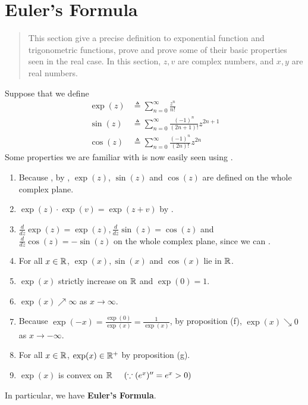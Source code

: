 \documentclass{report}
\begin{document}
\section{Euler's Formula}
\begin{abstract}
This section give a precise definition to exponential function and trigonometric functions, prove  and prove some of their basic properties seen in the real case. In this section, $z,v$ are complex numbers, and $x,y$ are real numbers.   
\end{abstract}
\begin{mdframed}
Suppose that we define 
\begin{align*}
\exp(z)&\triangleq \sum_{n=0}^\infty \frac{z^n}{n!}\\
\sin (z)&\triangleq \sum_{n=0}^\infty \frac{(-1)^n}{(2n+1)!}z^{2n+1}\\
\cos (z)&\triangleq \sum_{n=0}^\infty \frac{(-1)^n}{(2n)!}z^{2n}
\end{align*}
Some properties we are familiar with is now easily seen using . 
\begin{enumerate}[label=(\alph*)]
  \item Because , by , $\exp(z)$, $\sin(z)$ and $\cos(z)$ are defined on the whole complex plane.  
  \item $\exp(z)\cdot \exp(v)=\exp(z+v)$ by . 
  \item $\frac{d}{dz}\exp (z)=\exp (z), \frac{d}{dz}\sin (z)=\cos (z)$ and $\frac{d}{dz}\cos (z)=-\sin (z)$ on the whole complex plane, since we can  . 
  \item For all $x\in\mathbb{R}$, $\exp (x),\sin (x)$ and $\cos (x)$ lie in $\mathbb{R}$.   
  \item $\exp(x)$  strictly increase on $\mathbb{R}$ and $\exp (0)=1$. 
  \item $\exp(x)\nearrow \infty$ as $x\to \infty$. 
  \item Because $\exp (-x)=\frac{\exp (0)}{\exp (x)}=\frac{1}{\exp (x)}$, by proposition (f),  $\exp (x)\searrow 0$ as $x \to -\infty$. 
  \item For all $x\in\mathbb{R}$, $\exp (x)\in\mathbb{R}^+$ by proposition (g). 
  \item $\exp (x)$ is convex on $\mathbb{R}\hspace{0.5cm}(\because (e^x)''=e^x>0)$  
\end{enumerate}
In particular, we have \textbf{Euler's Formula}. 
\end{mdframed}
\end{document}
